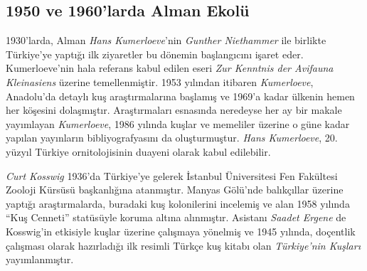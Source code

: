 \documentclass[
  a4paper,
  DIV=11,
  numbers=noendperiod]{scrreprt}
\begin{document}
\subsection*{1950 ve 1960'larda Alman
Ekolü}\label{ve-1960larda-alman-ekoluxfc}

1930'larda, Alman \emph{Hans Kumerloeve}'nin \emph{Gunther Niethammer}
ile birlikte Türkiye'ye yaptığı ilk ziyaretler bu dönemin başlangıcını
işaret eder. Kumerloeve'nin hala referans kabul edilen eseri \emph{Zur
Kenntnis der Avifauna Kleinasiens} üzerine temellenmiştir. 1953 yılından
itibaren \emph{Kumerloeve}, Anadolu'da detaylı kuş araştırmalarına
başlamış ve 1969'a kadar ülkenin hemen her köşesini dolaşmıştır.
Araştırmaları esnasında neredeyse her ay bir makale yayımlayan
\emph{Kumerloeve}, 1986 yılında kuşlar ve memeliler üzerine o güne kadar
yapılan yayınların bibliyografyasını da oluşturmuştur. \emph{Hans
Kumerloeve}, 20. yüzyıl Türkiye ornitolojisinin duayeni olarak kabul
edilebilir.

\emph{Curt Kosswig} 1936'da Türkiye'ye gelerek İstanbul Üniversitesi Fen
Fakültesi Zooloji Kürsüsü başkanlığına atanmıştır. Manyas Gölü'nde
balıkçıllar üzerine yaptığı araştırmalarda, buradaki kuş kolonilerini
incelemiş ve alan 1958 yılında ``Kuş Cenneti'' statüsüyle koruma altına
alınmıştır. Asistanı \emph{Saadet Ergene} de Kosswig'in etkisiyle kuşlar
üzerine çalışmaya yönelmiş ve 1945 yılında, doçentlik çalışması olarak
hazırladığı ilk resimli Türkçe kuş kitabı olan \emph{Türkiye'nin
Kuşları} yayımlanmıştır.
\end{document}
